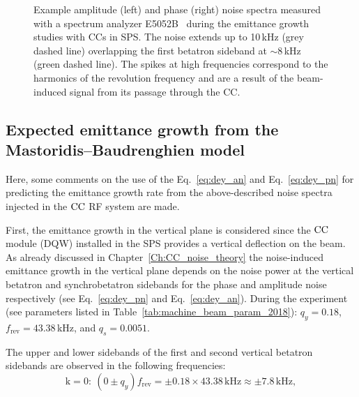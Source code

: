 \begin{figure}[!ht]
\begin{subfigure}[t]{0.45\textwidth}
   \end{subfigure}
   \hfill
    \caption{Example amplitude (left) and phase (right) noise spectra measured with a spectrum analyzer E5052B~\cite{E5052B_insight} during the emittance growth studies with CCs in SPS. The noise extends up to 10\,kHz (grey dashed line) overlapping the first betatron sideband at $\sim$8\,kHz (green dashed line). The spikes at high frequencies correspond to the harmonics of the revolution frequency and are a result of the beam-induced signal from its passage through the CC.} %
    \label{fig:example_PN_and_AN_coast1_setting2}
\end{figure}



\subsection{Expected emittance growth from the Mastoridis--Baudrenghien model}\label{subsec:expected_emitGrowth_2018}
Here, some comments on the use of the Eq.~\eqref{eq:dey_an} and Eq.~\eqref{eq:dey_pn} for predicting the emittance growth rate from the above-described noise spectra injected in the ${\mathrm{CC}}$ RF system are made.

First, the emittance growth in the vertical plane is considered since the ${\mathrm{CC}}$ module (DQW) installed in the SPS provides a vertical deflection on the beam. As already discussed in Chapter~\ref{Ch:CC_noise_theory} the noise-induced emittance growth in the vertical plane depends on the noise power at the vertical betatron and synchrobetatron sidebands for the phase and amplitude noise respectively (see Eq.~\eqref{eq:dey_pn} and Eq.~\eqref{eq:dey_an}). During the experiment (see parameters listed in Table~\ref{tab:machine_beam_param_2018}): $q_y=0.18$, $f_\mathrm{rev}=43.38$\,kHz, and $q_s=0.0051$. 

The upper and lower sidebands of the first and second vertical betatron sidebands are observed in the following frequencies:
\begin{equation}\label{eq:betatron_sideband_1}
    \mathrm{k=0}: \ (0 \pm q_y) f_\mathrm{rev} = \pm 0.18 \times 43.38\mathrm{\,kHz} \approx \pm 7.8\mathrm{\,kHz},
\end{equation}

